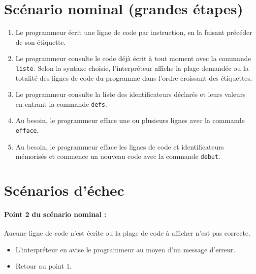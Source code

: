 \documentclass[12pt,a4paper]{article}
\begin{document}
        \section{Scénario nominal (grandes étapes)}
            \begin{enumerate}
                \item Le programmeur écrit une ligne de code par instruction, en la
                      faisant précéder de son étiquette.

                \item Le programmeur consulte le code déjà écrit à tout moment avec la
                      commande \verb|liste|. Selon la syntaxe choisie, l'interpréteur
                      affiche la plage demandée ou la totalité des lignes de code
                      du programme dans l'ordre croissant des étiquettes.

                \item Le programmeur consulte la liste des identificateurs déclarés et
                      leurs valeurs en entrant la commande \verb|defs|.

                \item Au besoin, le programmeur efface une ou plusieurs lignes avec la
                      commande \verb|efface|.

                \item Au besoin, le programmeur efface les lignes de code et identificateurs
                      mémorisés et commence un nouveau code avec la commande \verb|debut|.
            \end{enumerate}

        \section{Scénarios d'échec}

            \paragraph{Point 2 du scénario nominal :} Aucune ligne de code n'est écrite ou
            la plage de code à afficher n'est pas correcte.
            \begin{itemize}
                \item L'interpréteur en avise le programmeur au moyen d'un message d'erreur.
                \item Retour au point 1.
            \end{itemize}
\end{document}
